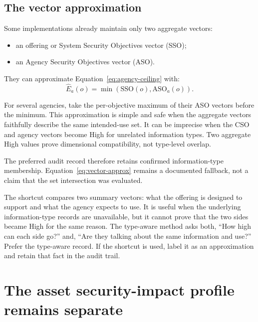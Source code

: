 \documentclass[11pt]{article}
\begin{document}
\subsection{The vector approximation}

Some implementations already maintain only two aggregate vectors:

\begin{itemize}[leftmargin=1.5em]
\item an offering or System Security Objectives vector (SSO);
\item an Agency Security Objectives vector (ASO).
\end{itemize}

They can approximate Equation~\eqref{eq:agency-ceiling} with:
\begin{equation}
\widehat{E}_a(o)=\min(\mathrm{SSO}(o),\mathrm{ASO}_a(o)).
\label{eq:vector-approx}
\end{equation}

For several agencies, take the per-objective maximum of their ASO vectors before
the minimum. This approximation is simple and safe when the aggregate vectors
faithfully describe the same intended-use set. It can be imprecise when the CSO and
agency vectors become High for unrelated information types. Two aggregate High
values prove dimensional compatibility, not type-level overlap.

The preferred audit record therefore retains confirmed information-type membership.
Equation~\eqref{eq:vector-approx} remains a documented fallback, not a claim that
the set intersection was evaluated.

\begin{plain}
The shortcut compares two summary vectors: what the offering is designed to support
and what the agency expects to use. It is useful when the underlying information-type
records are unavailable, but it cannot prove that the two sides became High for the
same reason. The type-aware method asks both, ``How high can each side go?'' and,
``Are they talking about the same information and use?'' Prefer the type-aware
record. If the shortcut is used, label it as an approximation and retain that fact
in the audit trail.
\end{plain}

\section{The asset security-impact profile remains separate}
\end{document}
